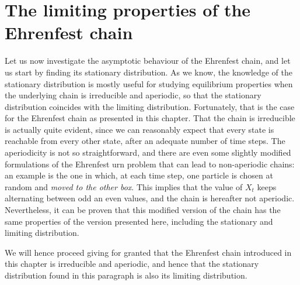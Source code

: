 \section{The limiting properties of the Ehrenfest chain}
Let us now investigate the asymptotic behaviour of the Ehrenfest chain, and let us start by finding its stationary distribution. As we know, the knowledge of the stationary distribution is mostly useful for studying equilibrium properties when the underlying chain is irreducible and aperiodic, so that the stationary distribution coincides with the limiting distribution. Fortunately, that is the case for the Ehrenfest chain as presented in this chapter. That the chain is irreducible is actually quite evident, since we can reasonably expect that every state is reachable from every other state, after an adequate number of time steps. The aperiodicity is not so straightforward, and there are even some slightly modified formulations of the Ehrenfest urn problem that can lead to non-aperiodic chains: an example is the one in which, at each time step, one particle is chosen at random and \emph{moved to the other box}. This implies that the value of $X_t$ keeps alternating between odd an even values, and the chain is hereafter not aperiodic. Nevertheless, it can be proven that this modified version of the chain has the same properties of the version presented here, including the stationary and limiting distribution. 

We will hence proceed giving for granted that the Ehrenfest chain introduced in this chapter is irreducible and aperiodic, and hence that the stationary distribution found in this paragraph is also its limiting distribution.


